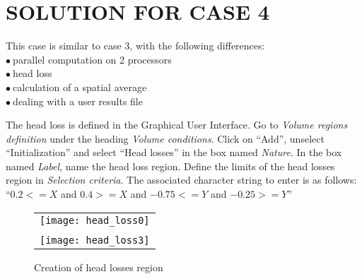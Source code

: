 
%
%
%
%


\section{SOLUTION FOR CASE 4}
This case is similar to case 3, with the following differences:\\
\hspace*{1cm}$\bullet\ $parallel computation on 2 processors\\
\hspace*{1cm}$\bullet\ $head loss\\
\hspace*{1cm}$\bullet\ $calculation of a spatial average\\
\hspace*{1cm}$\bullet\ $dealing with a user results file

The head loss is defined in the Graphical User Interface. Go to {\itshape Volume regions definition} under the heading {\itshape Volume conditions}. Click on ``Add'', unselect ``Initialization'' and select ``Head losses'' in the box named {\itshape Nature}. In the box named {\itshape Label}, name the head loss region. Define the limits of the head losses region in {\itshape Selection criteria}. The associated character string to enter is as follows:
``$0.2 <= X$ and $0.4 >= X$ and $-0.75 <= Y$ and $-0.25 >= Y$''

\begin{figure}[h!]
\begin{center}
\begin{tabular}{c}
\texttt{[image: head\_loss0]} \\
\\
\texttt{[image: head\_loss3]}
\end{tabular}
\caption{Creation of head losses region}
\label{fig_hl1}
\end{center}
\end{figure}

